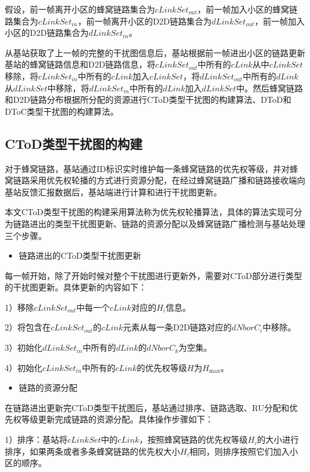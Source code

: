 \documentclass[figurelist,tablelist,algorithmlist,nomlist,masters]{seuthesix}
\begin{document}
	假设，前一帧离开小区的蜂窝链路集合为$cLinkSet_{out}$，前一帧加入小区的蜂窝链路集合为$cLinkSet_{in}$，前一帧离开小区的D2D链路集合为$dLinkSet_{out}$，前一帧加入小区的D2D链路集合为$dLinkSet_{in}$。
	
	从基站获取了上一帧的完整的干扰图信息后，基站根据前一帧进出小区的链路更新基站的蜂窝链路信息和D2D链路信息，将$cLinkSet_{out}$中所有的$cLink$从中$cLinkSet$移除，将$cLinkSet_{in}$中所有的$cLink$加入$cLinkSet$，将$dLinkSet_{out}$中所有的$dLink$从$dLinkSet$中移除，将$dLinkSet_{in}$中所有的$dLink$加入$dLinkSet$中。然后蜂窝链路和D2D链路分布根据所分配的资源进行CToD类型干扰图的构建算法、DToD和DToC类型干扰图的构建算法。
	
	\subsection{CToD类型干扰图的构建}
	
	对于蜂窝链路，基站通过ID标识实时维护每一条蜂窝链路的优先权等级，并对蜂窝链路采用优先权轮播的方式进行资源分配，在经过蜂窝链路广播和链路接收端向基站反馈汇报数据后，基站端进行计算和进行干扰图更新。
	
	本文CToD类型干扰图的构建采用算法称为优先权轮播算法，具体的算法实现可分为链路进出的类型干扰图更新、链路的资源分配以及蜂窝链路广播检测与基站处理三个步骤。
	
	\begin{itemize}
		\item 链路进出的CToD类型干扰图更新
	\end{itemize}
	
	每一帧开始，除了开始时候对整个干扰图进行更新外，需要对CToD部分进行类型的干扰图更新。具体更新的内容如下：
	
	1）移除$cLinkSet_{out}$中每一个$cLink$对应的${H_i}$信息。
	
	2）将包含在$cLinkSet_{out}$的$cLink$元素从每一条D2D链路对应的$dNborC_i$中移除。
	
	3）初始化$dLinkSet_{in}$中所有的$dLink$的$dNborC_k$为空集。
	
	4）初始化$cLinkSet_{in}$中所有的$cLink$的优先权等级${H}$为${H_{\max }}$。
	
	\begin{itemize}
		\item 链路的资源分配
	\end{itemize}
	
	在链路进出更新完CToD类型干扰图后，基站通过排序、链路选取、RU分配和优先权等级更新完成链路的资源分配。具体操作步骤如下：
	
	1）排序：基站将$cLinkSet$中的$cLink$，按照蜂窝链路的优先权等级${H_i}$的大小进行排序，如果两条或者多条蜂窝链路的优先权大小${H_i}$相同，则排序按照它们加入小区的顺序。
	
\end{document}
